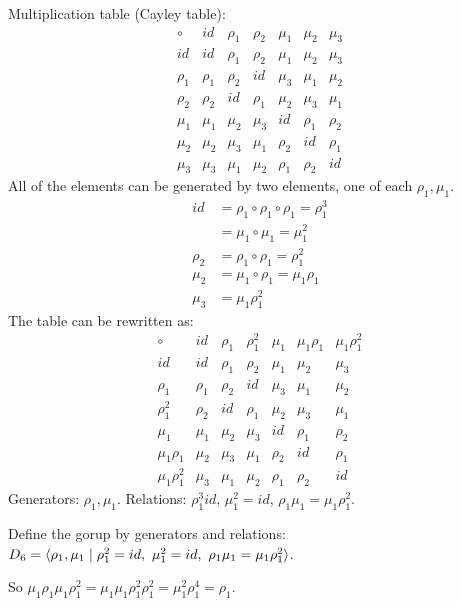 \documentclass[]{article}
\begin{document}
\begin{example}
	Multiplication table (Cayley table):
	$$\begin{array}{c|cccccc}
		\circ & id & \rho_1 & \rho_2 & \mu_1 & \mu_2 & \mu_3 \\ 
		\hline
		id & id & \rho_1 & \rho_2 & \mu_1 & \mu_2 & \mu_3 \\ 
		\rho_1 & \rho_1 & \rho_2 & id & \mu_3 & \mu_1 & \mu_2 \\ 
		\rho_2 & \rho_2 & id & \rho_1 & \mu_2 & \mu_3 & \mu_1 \\ 
		\mu_1 & \mu_1 & \mu_2 & \mu_3 & id & \rho_1 & \rho_2 \\ 
		\mu_2 & \mu_2 & \mu_3 & \mu_1 & \rho_2 & id & \rho_1 \\ 
		\mu_3 & \mu_3 & \mu_1 & \mu_2 & \rho_1 & \rho_2 & id
	\end{array}$$
	All of the elements can be generated by two elements, one of each $\rho_1,\mu_1$.
	\begin{align*}
		id &= \rho_1\circ \rho_1 \circ \rho_1 = \rho_1^3 \\
		   &= \mu_1\circ\mu_1 = \mu_1^2 \\
		\rho_2 &= \rho_1\circ\rho_1 = \rho_1^2 \\
		\mu_2 &= \mu_1\circ\rho_1 = \mu_1\rho_1 \\
		\mu_3 &= \mu_1\rho_1^2
	\end{align*}
	The table can be rewritten as:
	$$\begin{array}{c|cccccc}
		\circ & id & \rho_1 & \rho_1^2 & \mu_1 & \mu_1\rho_1 & \mu_1\rho_1^2 \\
     	\hline
     	id & id & \rho_1 & \rho_2 & \mu_1 & \mu_2 & \mu_3 \\
     	\rho_1 & \rho_1 & \rho_2 & id & \mu_3 & \mu_1 & \mu_2 \\
	 	\rho_1^2 & \rho_2 & id & \rho_1 & \mu_2 & \mu_3 & \mu_1 \\
     	\mu_1 & \mu_1 & \mu_2 & \mu_3 & id & \rho_1 & \rho_2 \\
     	\mu_1\rho_1 & \mu_2 & \mu_3 & \mu_1 & \rho_2 & id & \rho_1 \\
     	\mu_1\rho_1^2 & \mu_3 & \mu_1 & \mu_2 & \rho_1 & \rho_2 & id
 	\end{array}$$
	Generators: $\rho_1,\mu_1$.
	Relations: $\rho_1^3 id$, $\mu_1^2 = id$, $\rho_1\mu_1 = \mu_1\rho_1^2$.

	Define the gorup by generators and relations: $D_6 =\langle \rho_1,\mu_1 \mid \rho_1^2 = id,\ \mu_1^2 = id,\ \rho_1\mu_1 = \mu_1\rho_1^2 \rangle$.

	So $\mu_1\rho_1\mu_1\rho_1^2 = \mu_1\mu_1\rho_1^2\rho_1^2 = \mu_1^2\rho_1^4 = \rho_1$.
\end{example}
\end{document}

